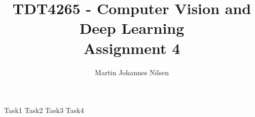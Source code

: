 \documentclass[12pt]{report}
\begin{document}
\title{TDT4265 - Computer Vision and Deep Learning\\\vspace{1cm}Assignment 4}
\author{Martin Johannes Nilsen}
\maketitle
\newpage


\frontmatter
\mainmatter

{Task1}
{Task2}
{Task3}
{Task4}



\end{document}
